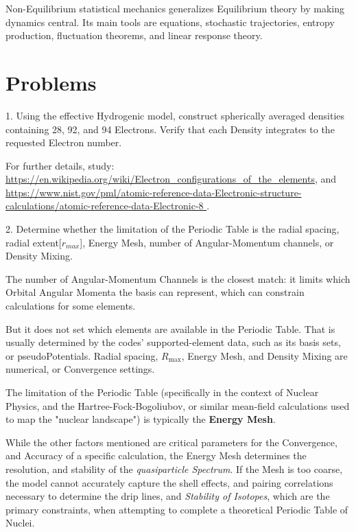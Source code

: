 \documentclass[a4paper, 10pt, onepage]{elegantbook}
\begin{document}
{Non-Equilibrium statistical mechanics generalizes Equilibrium theory by making
dynamics central. Its main tools are  equations, stochastic trajectories,
entropy production, fluctuation theorems, and linear response theory.

\newpage

\chapter{Problems}

\noindent

1. Using the effective Hydrogenic model, construct spherically averaged densities containing 28, 92, and 94 Electrons. 
Verify that each Density integrates to the requested Electron number.

For further details, study:
\url{https://en.wikipedia.org/wiki/Electron_configurations_of_the_elements},
and
\url{https://www.nist.gov/pml/atomic-reference-data-Electronic-structure-calculations/atomic-reference-data-Electronic-8
}.

2. Determine whether the limitation of the Periodic Table is the radial spacing, radial extent[$r_{max}$], 
Energy Mesh, number of Angular-Momentum channels, or Density Mixing.

The number of Angular-Momentum Channels is the closest match: it limits which Orbital Angular Momenta the basis can 
represent, 
which can constrain calculations for some elements.

But it does not set which elements are available in the Periodic Table. That is usually determined by the codes' 
supported-element data, 
such as its basis sets, or pseudoPotentials. Radial spacing, $R_{\max}$, Energy Mesh, and Density Mixing are numerical, 
or Convergence settings.

The limitation of the Periodic Table (specifically in the context of Nuclear Physics, and the Hartree-Fock-Bogoliubov,
 or similar mean-field calculations used to map the "nuclear landscape") is typically the \textbf{Energy 
Mesh}.

While the other factors mentioned are critical parameters for the Convergence, and Accuracy of a specific calculation, 
the Energy Mesh determines the resolution, and stability of the \emph{quasiparticle Spectrum}. If the Mesh is too 
coarse, 
the model cannot accurately capture the shell effects, and pairing correlations necessary to determine the drip lines, 
and \emph{Stability of Isotopes}, which are the primary constraints, when attempting to complete a theoretical Periodic 
Table of Nuclei.

}
\end{document}
